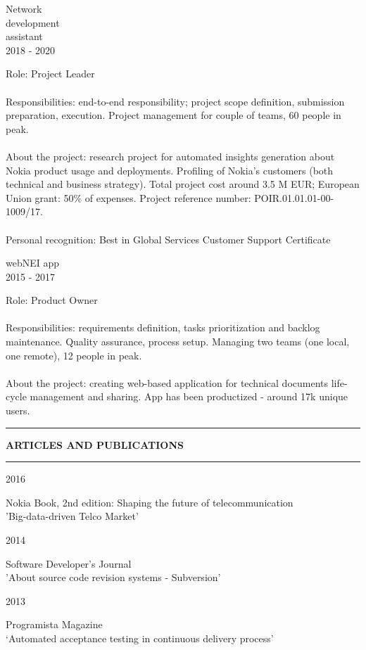 \documentclass[a4paper]{article}
\makeatletter
\newcommand*{\thickhrulefill}{%
\color{nokiaBlue}
\leavevmode %
\leaders\hrule depth -2pt height 3pt \hfill
\kern 0pt\relax %
\color{black}
}
\newcommand*{\thickhrule}{%
\color{nokiaBlue}
\rule[2pt]{0.7cm}{1pt}
\color{black}
}
\def\cvsekcja#1{%
\vspace{0.1cm}
\noindent\thickhrule
\MakeUppercase{\textbf{\footnotesize#1}}
\hspace{0.1cm}\color{nokiaBlue}\thickhrulefill
}
\def\cvwpis#1#2{%
\noindent
\newline
\begin{minipage}[t]{0.2\textwidth}
  \begin{flushleft}
  #1 
\end{flushleft}
\end{minipage}
\begin{minipage}[t]{0.8\textwidth}
  #2
\end{minipage}
}
\makeatother
\begin{document}
\cvwpis{Network\\ development\\ assistant \vspace{5pt} \\2018 - 2020}
{
    Role: Project Leader\\
    \vspace{-8pt}
    \\Responsibilities: end-to-end responsibility; project scope definition,
        submission preparation, execution. Project management for couple of teams,
        60 people in peak.\\
    \vspace{-8pt}
    \\About the project: research project for automated insights generation about Nokia
        product usage and deployments. Profiling of Nokia's customers (both
        technical and business strategy).
        Total project cost around 3.5 M EUR; European Union grant: 50\% of
        expenses.
        Project reference number: POIR.01.01.01-00-1009/17.\\
    \vspace{-8pt}
    \\Personal recognition: Best in Global Services Customer Support Certificate
}

\cvwpis{webNEI app \vspace{5pt} \\ 2015 - 2017}{
    Role: Product Owner\\
    \vspace{-8pt}
    \\Responsibilities: requirements definition, tasks prioritization and
    backlog maintenance. Quality assurance, process setup.
    Managing two teams (one local, one remote), 12 people in peak.\\
    \vspace{-8pt}
    \\About the project: creating web-based application for technical
    documents life-cycle management and sharing. App has been productized -
    around 17k unique users.
}

\cvsekcja{Articles and publications}

\cvwpis{2016}{Nokia Book, 2nd edition: Shaping the future of telecommunication\\'Big-data-driven Telco Market'}
\cvwpis{2014}{Software Developer's Journal\\'About source code revision systems - Subversion'}
\cvwpis{2013}{Programista Magazine\\ ‘Automated acceptance testing in continuous delivery process’}
\end{document}

